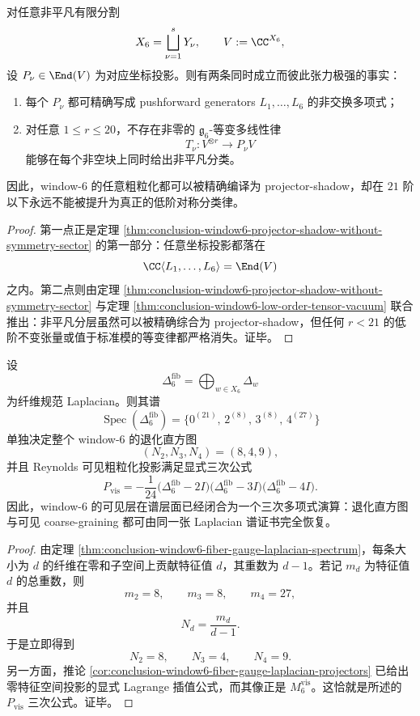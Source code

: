 \begin{corollary}\label{cor:conclusion-window6-coarse-graining-compile-equivariant-separation}
对任意非平凡有限分割
\[
X_6=\bigsqcup_{\nu=1}^s Y_\nu,
\qquad
V:=\CC^{X_6},
\]
设 \(P_\nu\in \End(V)\) 为对应坐标投影。则有两条同时成立而彼此张力极强的事实：
\begin{enumerate}
  \item 每个 \(P_\nu\) 都可精确写成 pushforward generators \(L_1,\dots,L_6\) 的非交换多项式；
  \item 对任意 \(1\le r\le 20\)，不存在非零的 \(\mathfrak g_6\)-等变多线性律
  \[
  T_\nu:V^{\otimes r}\to P_\nu V
  \]
  能够在每个非空块上同时给出非平凡分类。
\end{enumerate}
因此，window-\(6\) 的任意粗粒化都可以被精确编译为 projector-shadow，却在 \(21\) 阶以下永远不能被提升为真正的低阶对称分类律。
\end{corollary}
\begin{proof}
第一点正是定理 \ref{thm:conclusion-window6-projector-shadow-without-symmetry-sector} 的第一部分：任意坐标投影都落在
\[
\CC\langle L_1,\dots,L_6\rangle=\End(V)
\]
之内。第二点则由定理 \ref{thm:conclusion-window6-projector-shadow-without-symmetry-sector} 与定理 \ref{thm:conclusion-window6-low-order-tensor-vacuum} 联合推出：非平凡分层虽然可以被精确综合为 projector-shadow，但任何 \(r<21\) 的低阶不变张量或值于标准模的等变律都严格消失。证毕。
\end{proof}

\begin{corollary}\label{cor:conclusion-window6-visible-cubic-spectral-certificate}
设
\[
\Delta_6^{\mathrm{fib}}=\bigoplus_{w\in X_6}\Delta_w
\]
为纤维规范 Laplacian。则其谱
\[
\operatorname{Spec}(\Delta_6^{\mathrm{fib}})
=
\{0^{(21)},\,2^{(8)},\,3^{(8)},\,4^{(27)}\}
\]
单独决定整个 window-\(6\) 的退化直方图
\[
(N_2,N_3,N_4)=(8,4,9),
\]
并且 Reynolds 可见粗粒化投影满足显式三次公式
\[
P_{\mathrm{vis}}
=
-\frac1{24}\bigl(\Delta_6^{\mathrm{fib}}-2I\bigr)\bigl(\Delta_6^{\mathrm{fib}}-3I\bigr)\bigl(\Delta_6^{\mathrm{fib}}-4I\bigr).
\]
因此，window-\(6\) 的可见层在谱层面已经闭合为一个三次多项式演算：退化直方图与可见 coarse-graining 都可由同一张 Laplacian 谱证书完全恢复。
\end{corollary}
\begin{proof}
由定理 \ref{thm:conclusion-window6-fiber-gauge-laplacian-spectrum}，每条大小为 \(d\) 的纤维在零和子空间上贡献特征值 \(d\)，其重数为 \(d-1\)。若记 \(m_d\) 为特征值 \(d\) 的总重数，则
\[
m_2=8,\qquad m_3=8,\qquad m_4=27,
\]
并且
\[
N_d=\frac{m_d}{d-1}.
\]
于是立即得到
\[
N_2=8,\qquad N_3=4,\qquad N_4=9.
\]
另一方面，推论 \ref{cor:conclusion-window6-fiber-gauge-laplacian-projectors} 已给出零特征空间投影的显式 Lagrange 插值公式，而其像正是 \(M_6^{\mathrm{vis}}\)。这恰就是所述的 \(P_{\mathrm{vis}}\) 三次公式。证毕。
\end{proof}

